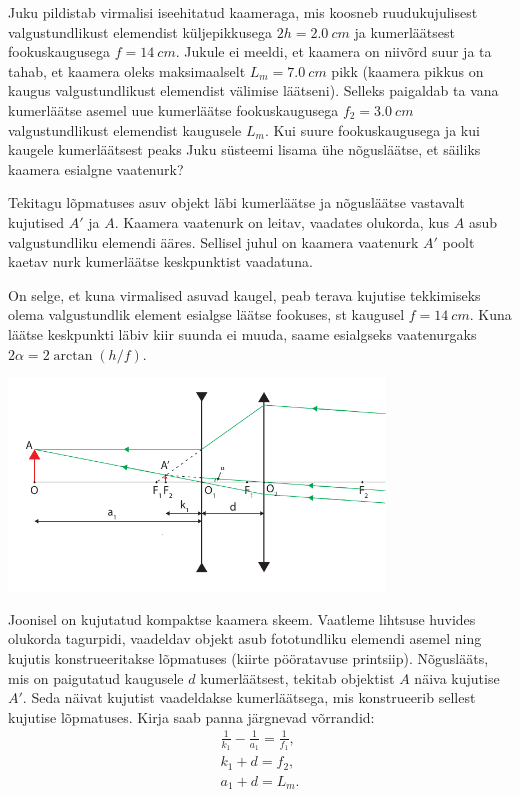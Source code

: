 
Juku pildistab virmalisi iseehitatud kaameraga, mis koosneb ruudukujulisest
valgustundlikust elemendist küljepikkusega $2h=\SI{2.0}{cm}$ ja kumerläätsest
fookuskaugusega $f=\SI{14}{cm}.$ Jukule ei meeldi, et kaamera on
niivõrd suur ja ta tahab, et kaamera oleks maksimaalselt $L_{m}=\SI{7.0}{cm}$
pikk (kaamera pikkus on kaugus valgustundlikust elemendist välimise läätseni).
Selleks paigaldab ta vana kumerläätse asemel uue kumerläätse fookuskaugusega $f_{2}=\SI{3.0}{cm}$
valgustundlikust elemendist kaugusele $L_{m}.$ Kui suure fookuskaugusega
ja kui kaugele kumerläätsest peaks Juku süsteemi
lisama ühe nõgusläätse, et säiliks kaamera esialgne vaatenurk?

\hint
Tekitagu lõpmatuses asuv objekt läbi kumerläätse ja nõgusläätse vastavalt kujutised $A'$ ja $A$. Kaamera vaatenurk on leitav, vaadates olukorda, kus $A$ asub valgustundliku elemendi ääres. Sellisel juhul on kaamera vaatenurk $A'$ poolt kaetav nurk kumerläätse keskpunktist vaadatuna.

\solu
On selge, et kuna virmalised asuvad kaugel, peab terava kujutise
tekkimiseks olema valgustundlik element esialgse läätse fookuses,
st kaugusel $f=\SI{14}{cm}.$ Kuna läätse keskpunkti läbiv kiir suunda
ei muuda, saame esialgseks vaatenurgaks $2\alpha=2\arctan\left(h/f\right).$

\begin{center}
	\includegraphics[width=10cm]{2017-v3g-08-skeem__telephoto.pdf}
\end{center}
Joonisel on kujutatud kompaktse kaamera skeem. Vaatleme lihtsuse huvides
olukorda tagurpidi, vaadeldav objekt asub fototundliku elemendi asemel
ning kujutis konstrueeritakse lõpmatuses (kiirte pööratavuse printsiip).
Nõguslääts, mis on paigutatud kaugusele $d$ kumerläätsest, tekitab
objektist $A$ näiva kujutise $A'$. Seda näivat kujutist vaadeldakse
kumerläätsega, mis konstrueerib sellest kujutise lõpmatuses. Kirja
saab panna järgnevad võrrandid:
\begin{eqnarray}
\frac{1}{k_{1}}-\frac{1}{a_{1}} = \frac{1}{f_{1}}, \label{2017-v3g-08-eq:telelens-eq1}\\
k_{1}+d = f_{2},\\
a_{1}+d = L_{m}.
\end{eqnarray}

